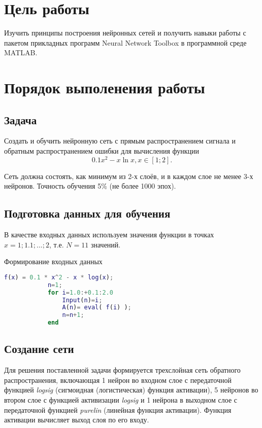 \section{Цель работы}
	Изучить принципы построения нейронных сетей и получить навыки  работы с пакетом прикладных программ Neural Network Toolbox в программной среде MATLAB.
\section{Порядок выполенения работы}
	\subsection{Задача}
		Создать и обучить нейронную сеть с прямым распространением сигнала и обратным  распространением ошибки для вычисления функции
		\[0.1x^2-x\ln{x}, x\in{[1;2]}.\]
		
		Сеть должна состоять, как минимум из 2-х слоёв, и в каждом слое не менее 3-х нейронов. Точность обучения 5\% (не более 1000 эпох).
		
		
	\subsection{Подготовка данных для обучения}
		В качестве входных данных используем значения функции в точках $ x = 1;1.1;...;2 $, т.е. $ N=11 $ значений. 
		
		\begin{ListingEnv}[H]
			\caption{Формирование входных данных}
			\label{list:hwbeauty}
			\begin{lstlisting}[language={Matlab}]
			f(x) = 0.1 * x^2 - x * log(x);
			n=1;
			for i=1.0:+0.1:2.0
				Input(n)=i;
				A(n)= eval( f(i) );
				n=n+1;
			end
			\end{lstlisting}
		\end{ListingEnv}%
	
	\subsection{Создание сети}
		Для решения поставленной задачи формируется трехслойная сеть обратного распространения, включающая 1 нейрон во входном слое с передаточной функцией \textit{logsig} (сигмоидная (логистическая) функция активации), 5 нейронов во втором слое с функцией активизации \textit{logsig} и 1 нейрона в выходном слое с передаточной функцией \textit{purelin} (линейная функция активации). Функция активации вычисляет выход слоя по его входу.
		
